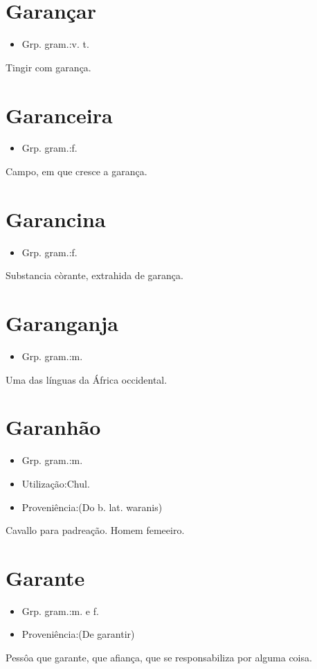 \section{Garançar}
\begin{itemize}
\item {Grp. gram.:v. t.}
\end{itemize}
Tingir com garança.
\section{Garanceira}
\begin{itemize}
\item {Grp. gram.:f.}
\end{itemize}
Campo, em que cresce a garança.
\section{Garancina}
\begin{itemize}
\item {Grp. gram.:f.}
\end{itemize}
Substancia còrante, extrahida de garança.
\section{Garanganja}
\begin{itemize}
\item {Grp. gram.:m.}
\end{itemize}
Uma das línguas da África occidental.
\section{Garanhão}
\begin{itemize}
\item {Grp. gram.:m.}
\end{itemize}
\begin{itemize}
\item {Utilização:Chul.}
\end{itemize}
\begin{itemize}
\item {Proveniência:(Do b. lat. \textunderscore waranis\textunderscore )}
\end{itemize}
Cavallo para padreação.
Homem femeeiro.
\section{Garante}
\begin{itemize}
\item {Grp. gram.:m.  e  f.}
\end{itemize}
\begin{itemize}
\item {Proveniência:(De \textunderscore garantir\textunderscore )}
\end{itemize}
Pessôa que garante, que afiança, que se responsabiliza por alguma coisa.
